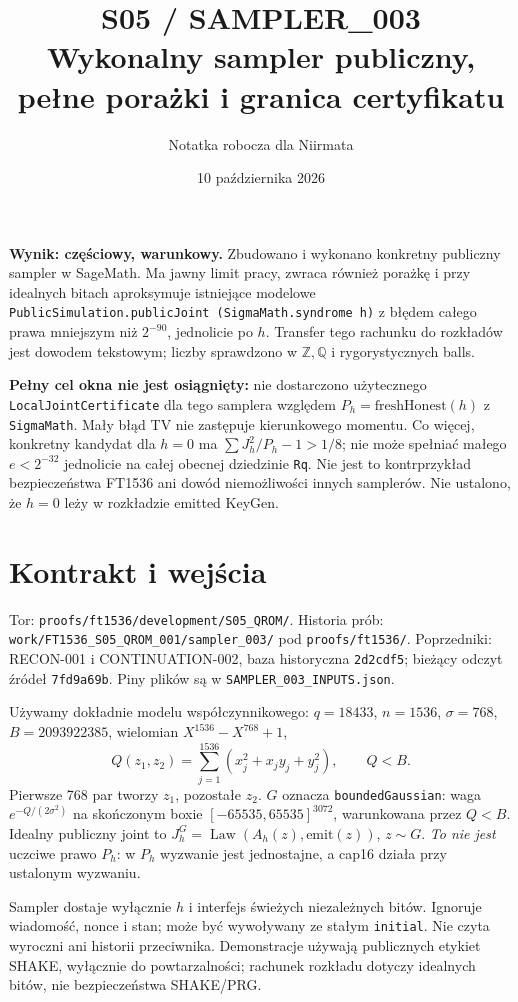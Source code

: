 \documentclass[11pt,a4paper]{article}
\title{S05 / SAMPLER\_003\\\large Wykonalny sampler publiczny, pełne porażki i granica certyfikatu}
\author{Notatka robocza dla Niirmata}
\date{10 października 2026}
\newcommand{\code}[1]{\nolinkurl{#1}}
\newcommand{\Law}{\operatorname{Law}}
\begin{document}
\maketitle

\textbf{Wynik: częściowy, warunkowy.} Zbudowano i wykonano konkretny
publiczny sampler w SageMath. Ma jawny limit pracy, zwraca również porażkę
i przy idealnych bitach aproksymuje istniejące modelowe
\code{PublicSimulation.publicJoint (SigmaMath.syndrome h)} z błędem
całego prawa mniejszym niż $2^{-90}$, jednolicie po $h$.
Transfer tego rachunku do rozkładów jest dowodem tekstowym; liczby
sprawdzono w $\mathbb Z,\mathbb Q$ i rygorystycznych balls.

\textbf{Pełny cel okna nie jest osiągnięty:} nie dostarczono użytecznego
\code{LocalJointCertificate} dla tego samplera względem
$P_h=\mathrm{freshHonest}(h)$ z \code{SigmaMath}.
Mały błąd TV nie zastępuje kierunkowego momentu.
Co więcej, konkretny kandydat dla $h=0$ ma
$\sum J_h^2/P_h-1>1/8$; nie może spełniać małego $e<2^{-32}$
jednolicie na całej obecnej dziedzinie \code{Rq}.
Nie jest to kontrprzykład bezpieczeństwa FT1536 ani dowód niemożliwości
innych samplerów. Nie ustalono, że $h=0$ leży w rozkładzie emitted KeyGen.

\section{Kontrakt i wejścia}
Tor: \code{proofs/ft1536/development/S05_QROM/}.
Historia prób: \code{work/FT1536_S05_QROM_001/sampler_003/} pod
\code{proofs/ft1536/}. Poprzedniki: RECON-001 i CONTINUATION-002,
baza historyczna \code{2d2cdf5}; bieżący odczyt źródeł \code{7fd9a69b}.
Piny plików są w \code{SAMPLER_003_INPUTS.json}.

Używamy dokładnie modelu współczynnikowego: $q=18433$, $n=1536$,
$\sigma=768$, $B=2093922385$, wielomian $X^{1536}-X^{768}+1$,
\[
 Q(z_1,z_2)=\sum_{j=1}^{1536}(x_j^2+x_jy_j+y_j^2),\qquad Q<B.
\]
Pierwsze 768 par tworzy $z_1$, pozostałe $z_2$.
$G$ oznacza \code{boundedGaussian}: waga $e^{-Q/(2\sigma^2)}$
na skończonym boxie $[-65535,65535]^{3072}$, warunkowana przez $Q<B$.
Idealny publiczny joint to $J^G_h=\Law(A_h(z),\mathrm{emit}(z))$, $z\sim G$.
\emph{To nie jest} uczciwe prawo $P_h$: w $P_h$ wyzwanie jest jednostajne,
a cap16 działa przy ustalonym wyzwaniu.

Sampler dostaje wyłącznie $h$ i interfejs świeżych niezależnych bitów.
Ignoruje wiadomość, nonce i stan; może być wywoływany ze stałym
\code{initial}. Nie czyta wyroczni ani historii przeciwnika.
Demonstracje używają publicznych etykiet SHAKE, wyłącznie do powtarzalności;
rachunek rozkładu dotyczy idealnych bitów, nie bezpieczeństwa SHAKE/PRG.
\end{document}
